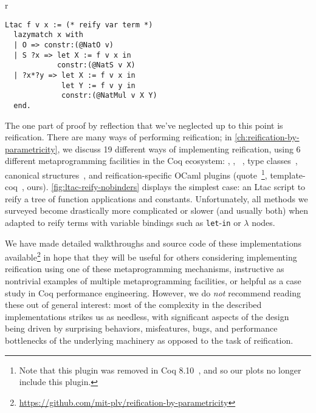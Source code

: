 
\begin{wrapfigure}[12]{r}{}
\begin{verbatim}
Ltac f v x := (* reify var term *)
  lazymatch x with
  | O => constr:(@NatO v)
  | S ?x => let X := f v x in
            constr:(@NatS v X)
  | ?x*?y => let X := f v x in
             let Y := f v y in
             constr:(@NatMul v X Y)
  end.
\end{verbatim}
\caption{Reification Without Binders in~\Ltac}\label{fig:ltac-reify-nobinders}
\end{wrapfigure}

The one part of proof by reflection that we've neglected up to this point is reification.
There are many ways of performing reification; in \autoref{ch:reification-by-parametricity}, we discuss 19 different ways of implementing reification, using 6 different metaprogramming facilities in the Coq ecosystem: \Ltac, \LtacTwo, \MtacTwo~\cite{lessadhoc,Mtac2}, type classes~\cite{sozeau2008first}, canonical structures~\cite{gonthier2016small}, and reification-specific OCaml plugins (quote~\cite{quote-plugin}\footnote{Note that this plugin was removed in Coq 8.10~\cite{coq-pr-remove-quote-plugin}, and so our plots no longer include this plugin.}, template-coq~\cite{TemplateCoq}, ours).
\autoref{fig:ltac-reify-nobinders} displays the simplest case: an Ltac script to reify a tree of function applications and constants.
Unfortunately, all methods we surveyed become drastically more complicated or slower (and usually both) when adapted to reify terms with variable bindings such as \texttt{let}-\texttt{in} or \texttt{$\lambda$} nodes.

We have made detailed walkthroughs and source code of these implementations available\footnote{\url{https://github.com/mit-plv/reification-by-parametricity}} in hope that they will be useful for others considering implementing reification using one of these metaprogramming mechanisms, instructive as nontrivial examples of multiple metaprogramming facilities, or helpful as a case study in Coq performance engineering.
However, we do \emph{not} recommend reading these out of general interest:
most of the complexity in the described implementations strikes us as needless,
with significant aspects of the design being driven by surprising behaviors, misfeatures, bugs, and performance bottlenecks of the underlying machinery as opposed to the task of reification.

